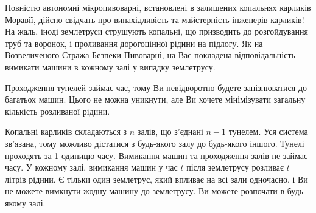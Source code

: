 
\noindent
Повністю автономні мікропивоварні, встановлені в залишених копальнях карликів Моравії, дійсно свідчать про винахідливість та майстерність інженерів-карликів!
На жаль, іноді землетруси струшують копальні, що призводить до розгойдування труб та воронок, і проливання дорогоцінної рідини на підлогу.
Як на Возвеличеного Стража Безпеки Пивоварні, на Вас покладена відповідальність вимикати машини в кожному залі у випадку землетрусу.

Проходження тунелей займає час,
тому Ви невідворотно будете запізнюватися до багатьох машин.
Цього не можна уникнути, але Ви хочете мінімізувати загальну кількість розливаної рідини.

\medskip
Копальні карликів складаються з $n$ залів, що з'єднані $n-1$ тунелем.
Уся система зв'язана, тому можливо дістатися з будь-якого залу до будь-якого іншого.
Тунелі проходять за 1 одиницю часу.
Вимикання машин та проходження залів не займає часу.
У кожному залі, вимикання машин у час $t$ після землетрусу розливає $t$ літрів рідини.
Є тільки один землетрус, який впливає на всі зали одночасно, і Ви не можете вимкнути жодну машину до землетрусу.
Ви можете розпочати в будь-якому залі.

